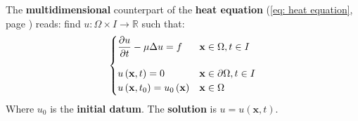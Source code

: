 The \textbf{multidimensional} counterpart of the \textbf{heat equation} (\ref{eq: heat equation}, page \pageref{eq: heat equation}) reads: find $u : \Omega \times I \rightarrow \mathbb{R}$ such that:
\begin{equation}\index{Multidimensional Heat equation}
    \begin{cases}
        \dfrac{\partial u}{\partial t} - \mu\Delta u = f & \mathbf{x} \in \Omega, t \in I \vspace{1em} \\
        u\left(\mathbf{x}, t\right) = 0 & \mathbf{x} \in \partial\Omega, t \in I \\
        u\left(\mathbf{x}, t_{0}\right) = u_{0}\left(\mathbf{x}\right) & \mathbf{x} \in \Omega
    \end{cases}
\end{equation}
Where $u_{0}$ is the \textbf{initial datum}. The \textbf{solution} is $u = u\left(\mathbf{x}, t\right)$.